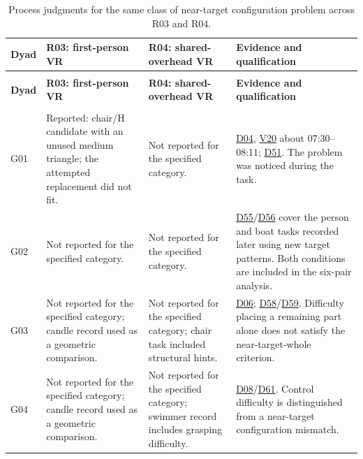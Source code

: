\begingroup
{}
\fontsize{9.5}{11.685}\selectfont
\setlength{\tabcolsep}{2.2pt}
\renewcommand{\arraystretch}{1.18}
\begin{longtable}{@{}>{\raggedright\arraybackslash}p{12.623mm}>{\raggedright\arraybackslash}p{45.637mm}>{\raggedright\arraybackslash}p{38.840mm}>{\raggedright\arraybackslash}p{58.260mm}@{}}
\caption[Process judgments for the same class of near-target configuration problem across R03 and R04.]{Process judgments for the same class of near-target configuration problem across R03 and R04.}\label{tab:A-3}\\
\toprule
\textbf{Dyad} & \textbf{R03: first-person VR} & \textbf{R04: shared-overhead VR} & \textbf{Evidence and qualification} \\
\midrule
\endfirsthead
\multicolumn{4}{l}{\small\itshape Table \thetable{} (continued)}\\
\toprule
\textbf{Dyad} & \textbf{R03: first-person VR} & \textbf{R04: shared-overhead VR} & \textbf{Evidence and qualification} \\
\midrule
\endhead
\midrule
\multicolumn{4}{r}{\small Continued on next page}\\
\endfoot
\bottomrule
\endlastfoot
G01 & Reported: chair/H candidate with an unused medium triangle; the attempted replacement did not fit. & Not reported for the specified category. & \hyperlink{src:D04}{D04}, \href{https://github.com/YiyangQin-UQ/REIT7841/blob/main/thesis/v1.1/materials/README.md\#d04}{V20} about 07:30--08:11; \hyperlink{src:D51}{D51}. The problem was noticed during the task. \\
\addlinespace[3pt]
G02 & Not reported for the specified category. & Not reported for the specified category. & \hyperlink{src:D55}{D55}/\hyperlink{src:D56}{D56} cover the person and boat tasks recorded later using new target patterns. Both conditions are included in the six-pair analysis. \\
\addlinespace[3pt]
G03 & Not reported for the specified category; candle record used as a geometric comparison. & Not reported for the specified category; chair task included structural hints. & \hyperlink{src:D06}{D06}; \hyperlink{src:D58}{D58}/\hyperlink{src:D59}{D59}. Difficulty placing a remaining part alone does not satisfy the near-target-whole criterion. \\
\addlinespace[3pt]
G04 & Not reported for the specified category; candle record used as a geometric comparison. & Not reported for the specified category; swimmer record includes grasping difficulty. & \hyperlink{src:D08}{D08}/\hyperlink{src:D61}{D61}. Control difficulty is distinguished from a near-target configuration mismatch. \\

\end{longtable}
